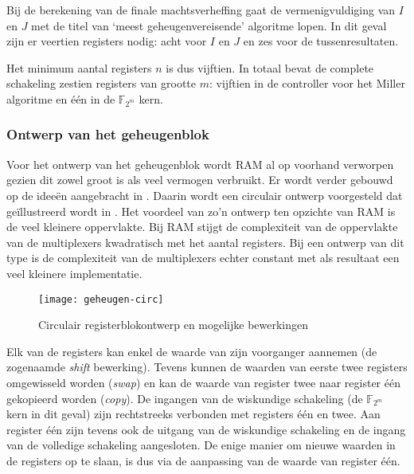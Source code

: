 Bij de berekening van de finale machtsverheffing gaat de vermenigvuldiging van $I$ en $J$ met de titel van `meest geheugenvereisende' algoritme lopen. In dit geval zijn er veertien registers nodig: acht voor $I$ en $J$ en zes voor de tussenresultaten.

Het minimum aantal registers $n$ is dus vijftien. In totaal bevat de complete schakeling zestien registers van grootte $m$: vijftien in de controller voor het Miller algoritme en \'e\'en in de $\mathbb{F}_{2^m}$ kern.

\subsubsection{Ontwerp van het geheugenblok}

Voor het ontwerp van het geheugenblok wordt RAM al op voorhand verworpen gezien dit zowel groot is als veel vermogen verbruikt. Er wordt verder gebouwd op de idee\"en aangebracht in \cite{lee}. Daarin wordt een circulair ontwerp voorgesteld dat ge\"illustreerd wordt in . Het voordeel van zo'n ontwerp ten opzichte van RAM is de veel kleinere oppervlakte. Bij RAM stijgt de complexiteit van de oppervlakte van de multiplexers kwadratisch met het aantal registers. Bij een ontwerp van dit type is de complexiteit van de multiplexers echter constant met als resultaat een veel kleinere implementatie.

\begin{figure}[h]
	\centering
		\texttt{[image: geheugen-circ]}
		\caption{Circulair registerblokontwerp en mogelijke bewerkingen\label{figuur-implementatie-miller-geheugen-circ}}
\end{figure}

Elk van de registers kan enkel de waarde van zijn voorganger aannemen (de zogenaamde \emph{shift} bewerking). Tevens kunnen de waarden van eerste twee registers omgewisseld worden (\emph{swap}) en kan de waarde van register twee naar register \'e\'en gekopieerd worden (\emph{copy}). De ingangen van de wiskundige schakeling (de $\mathbb{F}_{2^m}$ kern in dit geval) zijn rechtstreeks verbonden met registers \'e\'en en twee. Aan register \'e\'en zijn tevens ook de uitgang van de wiskundige schakeling en de ingang van de volledige schakeling aangesloten. De enige manier om nieuwe waarden in de registers op te slaan, is dus via de aanpassing van de waarde van register \'e\'en. %

